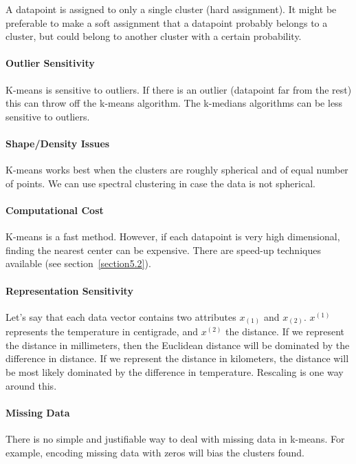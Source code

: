 A datapoint is assigned to only a single cluster (hard assignment). It might be preferable to make a soft assignment that a datapoint probably belongs to a cluster, but could belong to another cluster with a certain probability. 

\paragraph{Outlier Sensitivity}

K-means is sensitive to outliers. If there is an outlier (datapoint far from the rest) this can throw off the k-means algorithm. The k-medians algorithms can be less sensitive to outliers.

\paragraph{Shape/Density Issues}

K-means works best when the clusters are roughly spherical and of equal number of points. We can use spectral clustering in case the data is not spherical.

\paragraph{Computational Cost}

K-means is a fast method. However, if each datapoint is very high dimensional, finding the nearest center can be expensive. There are speed-up techniques available (see section~\ref{section5.2}).

\paragraph{Representation Sensitivity}

Let's say that each data vector contains two attributes $x_{(1)}$ and $x_{(2)}$. $x^{(1)}$ represents the temperature in centigrade, and $x^{(2)}$ the distance. If we represent the distance in millimeters, then the Euclidean distance will be dominated by the difference in distance. If we represent the distance in kilometers, the distance will be most likely dominated by the difference in temperature. Rescaling is one way around this.

\paragraph{Missing Data}

There is no simple and justifiable way to deal with missing data in k-means. For example, encoding missing data with zeros will bias the clusters found.



